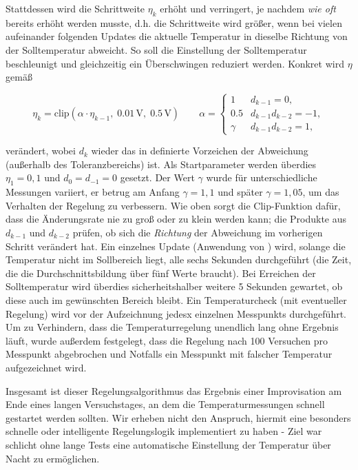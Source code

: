 \documentclass[11pt,a4paper]{article}
\begin{document}
Stattdessen wird die Schrittweite $\eta_k$ erhöht und verringert, je nachdem \emph{wie oft} bereits erhöht werden musste, d.h. die Schrittweite wird größer, wenn bei vielen aufeinander folgenden Updates die aktuelle Temperatur in dieselbe Richtung von der Solltemperatur abweicht. So soll die Einstellung der Solltemperatur beschleunigt und gleichzeitig ein Überschwingen reduziert werden. Konkret wird $\eta$ gemäß

\begin{equation} \label{eq:eta-update}
    \eta_{k} = \mathrm{clip}(\alpha \cdot\eta_{k-1},\;0.01\,\mathrm{V},\; 0.5\, \mathrm{V})
    \qquad
    \alpha =
    \begin{cases}
        1 & d_{k-1} = 0,\\
        0.5 & d_{k-1} d_{k-2} =-1,\\
        \gamma & d_{k-1} d_{k-2} =1,
    \end{cases}
\end{equation}

verändert, wobei $d_k$ wieder das in  definierte Vorzeichen der Abweichung (außerhalb des Toleranzbereichs) ist. Als Startparameter werden überdies $\eta_1=0{,}1$ und $d_{0}=d_{-1}=0$ gesetzt. Der Wert $\gamma$ wurde für unterschiedliche Messungen variiert, er betrug am Anfang $\gamma=1{,}1$ und später $\gamma=1{,}05$, um das Verhalten der Regelung zu verbessern. Wie oben sorgt die Clip-Funktion dafür, dass die Änderungsrate nie zu groß oder zu klein werden kann; die Produkte aus $d_{k-1}$ und $d_{k-2}$ prüfen, ob sich die \emph{Richtung} der Abweichung im vorherigen Schritt verändert hat.  Ein einzelnes Update (Anwendung von ) wird, solange die Temperatur nicht im Sollbereich liegt, alle sechs Sekunden durchgeführt (die Zeit, die die Durchschnittsbildung über fünf Werte braucht). Bei Erreichen der Solltemperatur wird überdies sicherheitshalber weitere 5 Sekunden gewartet, ob diese auch im gewünschten Bereich bleibt. Ein Temperaturcheck (mit eventueller Regelung) wird vor der Aufzeichnung jedesx einzelnen Messpunkts durchgeführt. Um zu Verhindern, dass die Temperaturregelung unendlich lang ohne Ergebnis läuft, wurde außerdem festgelegt, dass die Regelung nach 100 Versuchen pro Messpunkt abgebrochen und Notfalls ein Messpunkt mit falscher Temperatur aufgezeichnet wird. 

Insgesamt ist dieser Regelungsalgorithmus das Ergebnis einer Improvisation am Ende eines langen Versuchstages, an dem die Temperaturmessungen schnell gestartet werden sollten. Wir erheben nicht den Anspruch, hiermit eine besonders schnelle oder intelligente Regelungslogik implementiert zu haben - Ziel war schlicht ohne lange Tests eine automatische Einstellung der Temperatur über Nacht zu ermöglichen. 
\end{document}
